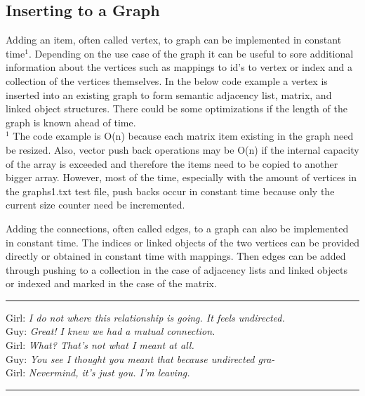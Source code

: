 \documentclass[letterpaper, 10pt]{article}
\begin{document}
\subsection{Inserting to a Graph}
Adding an item, often called vertex, to graph can be implemented in constant time\(^1\).
Depending on the use case of the graph it can be useful to sore additional information about the vertices
such as mappings to id's to vertex or index and a collection of the vertices themselves.
In the below code example a vertex is inserted into an existing graph to form semantic adjacency list, matrix,
and linked object structures. There could be some optimizations if the length of the graph is known ahead of time.\\
\(^1\) The code example is O(n) because each matrix item existing in the graph need be resized.
Also, vector push back operations may be O(n) if the internal capacity of the array is exceeded and
therefore the items need to be copied to another bigger array. However, most of the time, especially 
with the amount of vertices in the graphs1.txt test file, push backs occur in constant time because
only the current size counter need be incremented.

Adding the connections, often called edges, to a graph can also be implemented in constant time.
The indices or linked objects of the two vertices can be provided directly or obtained in constant time with
mappings. Then edges can be added through pushing to a collection in the case of adjacency lists and linked objects
or indexed and marked in the case of the matrix.

\vspace{.25cm}
\hrule
\vspace{.25cm}
\noindent
Girl: \textit{I do not where this relationship is going. It feels undirected.}\\
Guy: \textit{Great! I knew we had a mutual connection.}\\
Girl: \textit{What? That's not what I meant at all.}\\
Guy: \textit{You see I thought you meant that because undirected gra-}\\
Girl: \textit{Nevermind, it's just you. I'm leaving.}\\
\hrule
\vspace{1cm}
\end{document}
